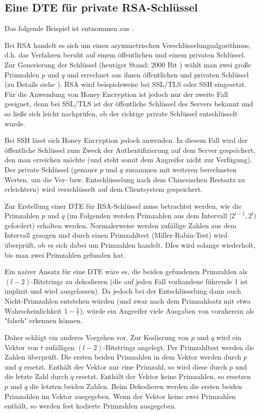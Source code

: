 \subsection{Eine DTE für private RSA-Schlüssel}

Das folgende Beispiel ist entnommen aus \cite{EURO2014}.

Bei RSA handelt es sich um einen asymmetrischen Verschlüsselungsalgorithmus, d.h. das Verfahren beruht auf einem öffentlichen und einem privaten Schlüssel. Zur Generierung der Schlüssel (heutiger Stand: 2000 Bit \cite{BSI2014}) wählt man zwei große  Primzahlen \(p\) und \(q\) und errechnet aus ihnen öffentlichen und privaten Schlüssel (zu Details siehe \cite{Schneier2006}). RSA wird beispielsweise bei SSL/TLS oder SSH eingesetzt. Für die Anwendung von Honey Encryption ist jedoch nur der zweite Fall geeignet, denn bei SSL/TLS ist der öffentliche Schlüssel des Servers bekannt und so ließe sich leicht nachprüfen, ob der richtige private Schlüssel entschlüsselt wurde. 

Bei SSH lässt sich Honey Encryption jedoch anwenden. In diesem Fall wird der öffentliche Schlüssel zum Zweck der Authentifizierung auf dem Server gespeichert, den man erreichen möchte (und steht somit dem Angreifer nicht zur Verfügung). Der private Schlüssel (genauer \(p\) und \(q\) zusammen mit weiteren berechneten Werten, um die Ver- bzw. Entschlüsselung nach dem Chinesischen Restsatz zu erleichtern) wird verschlüsselt auf dem Clientsystem gespeichert. 

Zur Erstellung einer DTE für RSA-Schlüssel muss betrachtet werden, wie die Primzahlen \(p\) und \(q\) (im Folgenden werden Primzahlen aus dem Intervall \([2^{l-1},2^l)\) gefordert) erhalten werden. Normalerweise werden zufällige Zahlen aus dem Intervall gezogen und durch einen Primzahltest (Miller-Rabin-Test) wird überprüft, ob es sich dabei um Primzahlen handelt. DIes wird solange wiederholt, bis man zwei Primzahlen gefunden hat. 

Ein naiver Ansatz für eine DTE wäre es, die beiden gefundenen Primzahlen als \((l-2)\)-Bitstrings zu dekodieren (die auf jeden Fall vorhandene führende 1 ist implizit und wird ausgelassen). Da jedoch bei der Entschlüsselung dann auch Nicht-Primzahlen entstehen würden (und zwar nach dem Primzahlsatz mit etwa Wahrscheinlichkeit \(1-\frac{1}{l}\)), würde ein Angreifer viele Ausgaben von vornherein als "falsch" erkennen können.

Daher schlägt \cite{EURO2014} ein anderes Vorgehen vor. Zur Kodierung von \(p\) und \(q\) wird ein Vektor von \(t\) zufälligen \((l-2)\)-Bitstrings angelegt. Per Primzahltest werden die Zahlen überprüft. Die ersten beiden Primzahlen in dem Vektor werden durch \(p\) und \(q\) ersetzt. Enthält der Vektor nur eine Primzahl, so wird diese durch \(p\) und die letzte Zahl durch \(q\) ersetzt. Enthält der Vektor keine Primzahlen, so ersetzen \(p\) und \(q\) die letzten beiden Zahlen. Beim Dekodieren werden die ersten beiden Primzahlen im Vektor ausgegeben. Wenn der Vektor keine zwei Primzahlen enthält, so werden fest kodierte Primzahlen ausgegeben.

